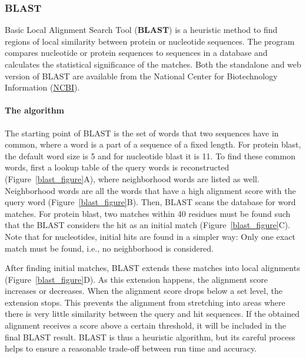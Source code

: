 \subsubsection{BLAST}

Basic Local Alignment Search Tool (\textbf{BLAST}) is a heuristic method to find regions of local similarity between protein or nucleotide sequences.
The program compares nucleotide or protein sequences to sequences in a database and calculates the statistical significance of the matches.
Both the standalone and web version of BLAST are available from the National Center for Biotechnology Information (\href{https://www.ncbi.nlm.nih.gov}{NCBI}).

\paragraph{The algorithm}\label{chapter2_blast_algorithm}

The starting point of BLAST is the set of words that two sequences have in common, where a word is a part of a sequence of a fixed length.
For protein blast, the default word size is 5 and for nucleotide blast it is 11.
To find these common words, first a lookup table of the query words is reconstructed (Figure~\ref{blast_figure}A), where neighborhood words are listed as well.
Neighborhood words are all the words that have a high alignment score with the query word (Figure~\ref{blast_figure}B).
Then, BLAST scans the database for word matches.
For protein blast, two matches within 40 residues must be found such that the BLAST considers the hit as an initial match (Figure~\ref{blast_figure}C).
Note that for nucleotides, initial hits are found in a simpler way:
Only one exact match must be found, i.e., no neighborhood is considered.

After finding initial matches, BLAST extends these matches into local alignments (Figure~\ref{blast_figure}D).
As this extension happens, the alignment score increases or decreases.
When the alignment score drops below a set level, the extension stops.
This prevents the alignment from stretching into areas where there is very little similarity between the query and hit sequences.
If the obtained alignment receives a score above a certain threshold, it will be included in the final BLAST result.
BLAST is thus a heuristic algorithm, but its careful process helps to ensure a reasonable trade-off between run time and accuracy.


